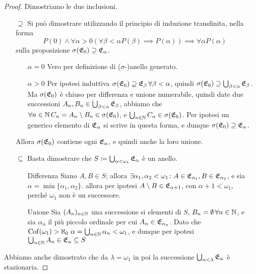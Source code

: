 \documentclass[../EserciziIstituzioniAnalisi.tex]{subfiles}
\begin{document}
\begin{proof}
  Dimostriamo le due inclusioni.
  \begin{itemize}
    \item[$\supseteq$] Si può dimostrare utilizzando il principio di induzione transfinita, nella forma
    $$P(0)\land \forall \alpha>0 \left(\forall \beta<\alpha P(\beta) \implies P(\alpha) \right) \implies \forall \alpha P(\alpha)$$
    sulla proposizione $\sigma(\mathfrak E_0)\supseteq\mathfrak E_{\alpha}$.
    \begin{itemize}
      \item[$\alpha=0$] Vero per definizione di ($\sigma$-)anello generato.
      \item[$\alpha>0$] Per ipotesi induttiva $\sigma(\mathfrak E_0)\supseteq\mathfrak E_{\beta}\, \forall \beta<\alpha$, quindi $\sigma(\mathfrak E_0)\supseteq\bigcup_{\beta<\alpha}\mathfrak E_{\beta}$. Ma $\sigma(\mathfrak E_0)$ è chiuso per differenza e unione numerabile, quindi date due successioni $A_n, B_n \in \bigcup_{\beta<\alpha}\mathfrak E_{\beta}$, abbiamo che $\forall n \in \mathbb N\, C_n=A_n\setminus B_n\in \sigma(\mathfrak E_0)$, e $\bigcup_{n\in \mathbb N}C_n \in \sigma(\mathfrak E_0)$. Per ipotesi un generico elemento di $\mathfrak E_{\alpha}$ si scrive in questa forma, e dunque $\sigma(\mathfrak E_0)\supseteq\mathfrak E_{\alpha}$.
    \end{itemize}
    Allora $\sigma(\mathfrak E_0)$ contiene ogni $\mathfrak E_{\alpha}$, e quindi anche la loro unione.
    \item[$\subseteq$] Basta dimostrare che $S\coloneqq\bigcup_{\alpha<\omega_1}\mathfrak E_{\alpha}$ è un anello.
    \begin{itemize}
      \item[Differenza] Siano $A,B\in S$; allora $\exists \alpha_1, \alpha_2<\omega_1 \colon A\in \mathfrak E_{\alpha_1}, B\in \mathfrak E_{\alpha_2}$, e sia $\alpha=\min\{\alpha_1, \alpha_2\}$. allora per ipotesi $A\setminus B\in\mathfrak E_{\alpha+1}$, con $\alpha+1<\omega_1$, perché $\omega_1$ non è un successore.      
      \item[Unione] Sia $(A_n)_{n\in\mathbb N}$ una successione si elementi di $S$, $B_n=\emptyset \, \forall n \in \mathbb N$, e sia $\alpha_n$ il più piccolo ordinale per cui $A_n\in \mathfrak E_{\alpha_n}$. Dato che $\operatorname{Cof}(\omega_1)>\aleph_0\ \alpha=\bigcup_{n \in \mathbb N}\alpha_n<\omega_1$, e dunque per ipotesi $\bigcup_{n \in \mathbb N} A_n\in \mathfrak E_{\alpha}\subseteq S$
    \end{itemize}
  \end{itemize}
  Abbiamo anche dimostrato che da $\lambda=\omega_1$ in poi la successione $\bigcup_{\alpha<\lambda}\mathfrak E_{\alpha}$ è stazionaria.
\end{proof}
\end{document}
